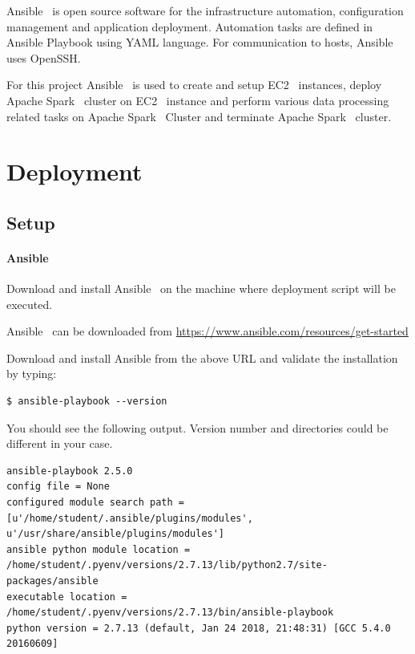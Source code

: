 Ansible~\cite{hid-sp18-511-www-ansible} is open source software for
the infrastructure automation, configuration management and
application deployment. Automation tasks are defined in Ansible
Playbook using YAML language. For communication to hosts, Ansible~\cite{hid-sp18-511-www-ansible} uses OpenSSH.

For this project Ansible~\cite{hid-sp18-511-www-ansible} is used to
create and setup EC2~\cite{hid-sp18-511-www-ec2} instances, deploy
Apache Spark~\cite{hid-sp18-511-www-spark} cluster on
EC2~\cite{hid-sp18-511-www-ec2} instance and perform various data
processing related tasks on Apache Spark~\cite{hid-sp18-511-www-spark}
Cluster and terminate Apache Spark~\cite{hid-sp18-511-www-spark} cluster.

\section{Deployment}

\subsection{Setup}

\paragraph{Ansible}
Download and install Ansible~\cite{hid-sp18-511-www-ansible} on the
machine where deployment script will be executed.

Ansible~\cite{hid-sp18-511-www-ansible} can be downloaded from
\url{https://www.ansible.com/resources/get-started}

Download and install Ansible from the above URL and validate the installation by typing:

\begin{verbatim}
$ ansible-playbook --version
\end{verbatim}

You should see the following output. Version number and directories could be different in your case.

\begin{verbatim}
ansible-playbook 2.5.0
config file = None
configured module search path = [u'/home/student/.ansible/plugins/modules', u'/usr/share/ansible/plugins/modules']
ansible python module location = /home/student/.pyenv/versions/2.7.13/lib/python2.7/site-packages/ansible
executable location = /home/student/.pyenv/versions/2.7.13/bin/ansible-playbook
python version = 2.7.13 (default, Jan 24 2018, 21:48:31) [GCC 5.4.0 20160609]
\end{verbatim}

